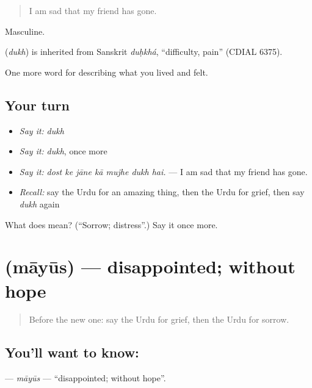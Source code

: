 \begin{quote}
I am sad that my friend has gone.
\end{quote}

Masculine.

\begin{cousinweb}
\textbf{} (\emph{dukh}) is inherited from Sanskrit \emph{duḥkhá}, \textquotedblleft{}difficulty, pain\textquotedblright{} (CDIAL 6375).
\end{cousinweb}

\begin{grammarlens}[title={What you've built}]
One more word for describing what you lived and felt.
\end{grammarlens}

\subsection*{Your turn}
\begin{itemize}
\raggedright
  \item \emph{Say it:} \emph{dukh}
  \item \emph{Say it:} \emph{dukh}, once more
  \item \emph{Say it:} \emph{dost ke jāne kā mujhe dukh hai.} — I am sad that my friend has gone.
  \item \emph{Recall:} say the Urdu for an amazing thing, then the Urdu for grief, then say \emph{dukh} again
\end{itemize}

\begin{tcolorbox}[breakable,colback=teal!4,colframe=teal!35!black,title={Before you move on}]
What does  mean? (\textquotedblleft{}Sorrow; distress\textquotedblright{}.) Say it once more.
\end{tcolorbox}
\section[\texorpdfstring{\ur{مایوس} (māyūs)}{مایوس (māyūs)}]{ (māyūs) — disappointed; without hope}

\label{lesson:UR-C443-mayus}



\begin{quote}
Before the new one: say the Urdu for grief, then the Urdu for sorrow.
\end{quote}

\subsection*{You'll want to know: }
\textbf{} — \emph{māyūs} — \textquotedblleft{}disappointed; without hope\textquotedblright{}.

